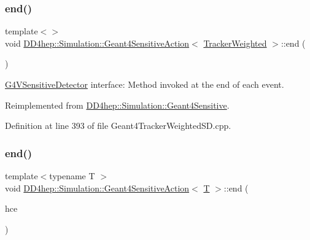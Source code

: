 \hypertarget{class_d_d4hep_1_1_simulation_1_1_geant4_sensitive_action_a9847064b0c71d72bc079dcc4ff00b64f}{}\label{class_d_d4hep_1_1_simulation_1_1_geant4_sensitive_action_a9847064b0c71d72bc079dcc4ff00b64f} 
\subsubsection{\texorpdfstring{end()}{end()}\hspace{0.1cm}{\footnotesize\ttfamily [1/2]}}
{\footnotesize\ttfamily template$<$$>$ \\
void \hyperlink{class_d_d4hep_1_1_simulation_1_1_geant4_sensitive_action}{D\+D4hep\+::\+Simulation\+::\+Geant4\+Sensitive\+Action}$<$ \hyperlink{struct_d_d4hep_1_1_simulation_1_1_tracker_weighted}{Tracker\+Weighted} $>$\+::end (\begin{DoxyParamCaption}\item[{G4\+H\+Cof\+This\+Event $\ast$}]{ }\end{DoxyParamCaption})\hspace{0.3cm}{\ttfamily [virtual]}}



\hyperlink{class_g4_v_sensitive_detector}{G4\+V\+Sensitive\+Detector} interface\+: Method invoked at the end of each event. 



Reimplemented from \hyperlink{class_d_d4hep_1_1_simulation_1_1_geant4_sensitive_abcce05101539a9941c06aada4625a608}{D\+D4hep\+::\+Simulation\+::\+Geant4\+Sensitive}.



Definition at line 393 of file Geant4\+Tracker\+Weighted\+S\+D.\+cpp.

\hypertarget{class_d_d4hep_1_1_simulation_1_1_geant4_sensitive_action_a144120acdde58a966bd627c572ca191d}{}\label{class_d_d4hep_1_1_simulation_1_1_geant4_sensitive_action_a144120acdde58a966bd627c572ca191d} 
\subsubsection{\texorpdfstring{end()}{end()}\hspace{0.1cm}{\footnotesize\ttfamily [2/2]}}
{\footnotesize\ttfamily template$<$typename T $>$ \\
void \hyperlink{class_d_d4hep_1_1_simulation_1_1_geant4_sensitive_action}{D\+D4hep\+::\+Simulation\+::\+Geant4\+Sensitive\+Action}$<$ \hyperlink{class_t}{T} $>$\+::end (\begin{DoxyParamCaption}\item[{G4\+H\+Cof\+This\+Event $\ast$}]{hce }\end{DoxyParamCaption})\hspace{0.3cm}{\ttfamily [virtual]}}



